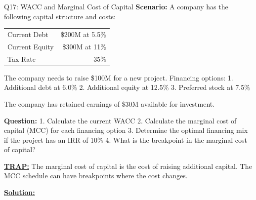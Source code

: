 \documentclass{beamer}
\renewcommand{\scriptsize}{\fontsize{6pt}{7pt}\selectfont}
\begin{document}
	\begin{frame}{Q17: WACC and Marginal Cost of Capital}
		\scriptsize
		\textbf{Scenario:} A company has the following capital structure and costs:
		
		\begin{tabular}{lr}
			Current Debt & \$200M at 5.5\% \\
			Current Equity & \$300M at 11\% \\
			Tax Rate & 35\% \\
		\end{tabular}
		
		The company needs to raise \$100M for a new project. Financing options:
		1. Additional debt at 6.0\%
		2. Additional equity at 12.5\%
		3. Preferred stock at 7.5\%
		
		The company has retained earnings of \$30M available for investment.
		
		\textbf{Question:}
		1. Calculate the current WACC
		2. Calculate the marginal cost of capital (MCC) for each financing option
		3. Determine the optimal financing mix if the project has an IRR of 10\%
		4. What is the breakpoint in the marginal cost of capital?
		
		\vspace{2pt}
		\underline{\textbf{TRAP:}} The marginal cost of capital is the cost of raising additional capital. The MCC schedule can have breakpoints where the cost changes.
		
		\vspace{4pt}
		\underline{\textbf{Solution:}}
	\end{frame}
	
\end{document}
